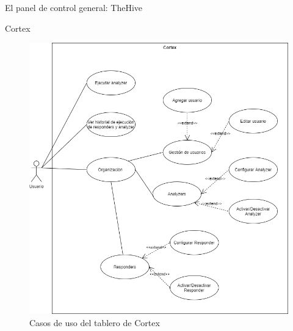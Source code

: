 \begin{section}{El panel de control general: TheHive }
\begin{subsection}{Cortex}
\begin{figure}[H]
      \includegraphics[width=1\textwidth]{./descripcion_sonion_imagenes/figura_31_cortex_tablero.png}
        \caption{Casos de uso del tablero de Cortex}
        \label{fig:caso_de_uso_tablero_cortex}
     \end{figure}
     \end{subsection}
   \end{section}

